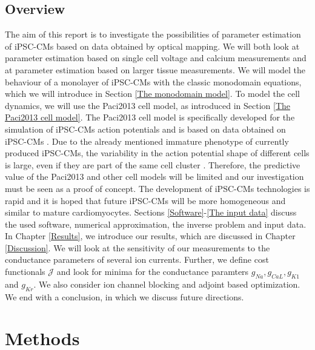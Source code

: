\documentclass{article}
\begin{document}
\subsection{Overview}
The aim of this report is to investigate the possibilities of parameter estimation of iPSC-CMs based on data obtained by optical mapping. We will both look at parameter estimation based on single cell voltage and calcium measurements and at parameter estimation based on larger tissue measurements.
We will model the behaviour of a monolayer of iPSC-CMs with the classic monodomain equations, which we will introduce in Section \ref{The monodomain model}. To model the cell dynamics, we will use the Paci2013 cell model, as introduced in Section \ref{The Paci2013 cell model}. The Paci2013 cell model is specifically developed for the simulation of iPSC-CMs action potentials and is based on data obtained on iPSC-CMs \cite{Paci2013, Ma2011}. Due to the already mentioned immature phenotype of currently produced iPSC-CMs, the variability in the action potential shape of different cells is large, even if they are part of the same cell cluster \cite{Blazeski, Zhu2016}. Therefore, the predictive value of the Paci2013 and other cell models will be limited and our investigation must be seen as a proof of concept. The development of iPSC-CMs technologies is rapid and it is hoped that future iPSC-CMs will be more homogeneous and similar to mature cardiomyocytes\cite{Denning2016}. Sections \ref{Software}-\ref{The input data} discuss the used software, numerical approximation, the inverse problem and input data. In Chapter \ref{Results}, we introduce our results, which are discussed in Chapter \ref{Discussion}. We will look at the sensitivity of our measurements to the conductance parameters of several ion currents. Further, we define cost functionals $\mathcal{J}$ and look for minima for the conductance paramters $g_{Na}, g_{CaL}, g_{K1}$ and $g_{Kr}$. We also consider ion channel blocking and adjoint based optimization. We end with a conclusion, in which we discuss future directions.
%
\section{Methods} \label{Methods}
\end{document}

